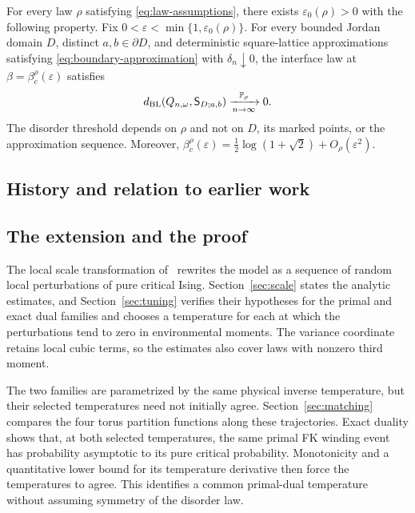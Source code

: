 \begin{theorem}\label{thm:main}
For every law $\rho$ satisfying \eqref{eq:law-assumptions}, there exists
$\varepsilon_0(\rho)>0$ with the following property. Fix
$0<\varepsilon<\min\{1,\varepsilon_0(\rho)\}$. For every bounded Jordan
domain $D$, distinct $a,b\in\partial D$, and deterministic square-lattice
approximations satisfying \eqref{eq:boundary-approximation} with
$\delta_n\downarrow0$, the interface law at
$\beta=\beta_c^\rho(\varepsilon)$ satisfies
\begin{equation}\label{eq:main-convergence}
 d_{\rm BL}(Q_{n,\omega},\mathsf S_{D;a,b})
     \xrightarrow[n\to\infty]{\mathbb P_\rho}0.
\end{equation}
The disorder threshold depends on $\rho$ and not on $D$, its marked points,
or the approximation sequence. Moreover,
$\beta_c^\rho(\varepsilon)=\tfrac12\log(1+\sqrt2)+O_\rho(\varepsilon^2)$.
\end{theorem}

\subsection{History and relation to earlier work}


\subsection{The extension and the proof}
The local scale transformation of~\cite{R} rewrites the model as a
sequence of random local perturbations of pure critical Ising.
Section~\ref{sec:scale} states the analytic estimates, and
Section~\ref{sec:tuning} verifies their hypotheses for the primal and
exact dual families and chooses a temperature for each at which the
perturbations tend to zero in environmental moments. The variance coordinate retains local cubic
terms, so the estimates also cover laws with nonzero third moment.

The two families are parametrized by the same physical inverse
temperature, but their selected temperatures need not initially agree.
Section~\ref{sec:matching} compares the four torus partition functions
along these trajectories. Exact duality shows that, at both selected
temperatures, the same primal FK winding event has probability
asymptotic to its pure critical probability. Monotonicity and a quantitative
lower bound for its temperature derivative then force the temperatures to
agree. This identifies a common primal-dual temperature without
assuming symmetry of the disorder law.

